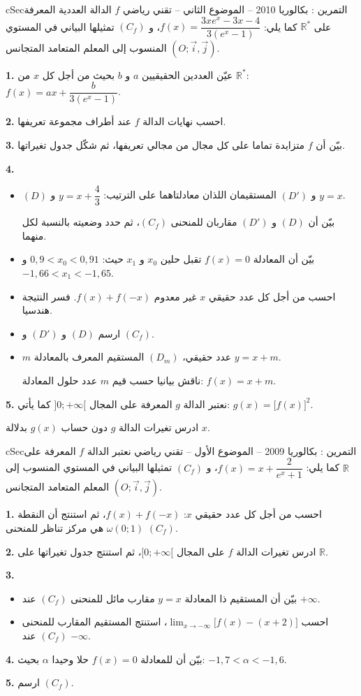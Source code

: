 \documentclass[12pt,a4paper]{article}
\newenvironment{BOX}[2]{\begin{otherlanguage}{english}\begin{arbox}{#1}{#2}}{\end{arbox}\end{otherlanguage}}
\newcounter{exo}
\newenvironment{tamrin}[1]{\stepcounter{exo}\begin{BOX}{cSec}{التمرين \theexo: #1}}{\end{BOX}}
\newcommand{\R}{\mathbb{R}}
\newenvironment{sq}{\begin{itemize}[leftmargin=2.4em,itemsep=3pt]}{\end{itemize}}
\newcommand{\qa}{\item[(أ)]}\newcommand{\qb}{\item[(ب)]}\newcommand{\qc}{\item[(جـ)]}\newcommand{\qd}{\item[(د)]}\newcommand{\qe}{\item[(هـ)]}
\newcommand{\QQ}[1]{\par\smallskip\textbf{#1.} }
\begin{document}
\begin{tamrin}{بكالوريا 2010 -- الموضوع الثاني -- تقني رياضي}
$f$ الدالة العددية المعرفة على $\R^*$ كما يلي: $f(x)=\dfrac{3xe^{x}-3x-4}{3\left(e^{x}-1\right)}$،
و $(C_f)$ تمثيلها البياني في المستوي المنسوب إلى المعلم المتعامد المتجانس $(O;\vec i,\vec j)$.
\QQ{1} عيّن العددين الحقيقيين $a$ و $b$ بحيث من أجل كل $x$ من $\R^*$: $f(x)=ax+\dfrac{b}{3\left(e^{x}-1\right)}$.
\QQ{2} احسب نهايات الدالة $f$ عند أطراف مجموعة تعريفها.
\QQ{3} بيّن أن $f$ متزايدة تماما على كل مجال من مجالي تعريفها، ثم شكّل جدول تغيراتها.
\QQ{4}
\begin{sq}
\qa $(D)$ و $(D')$ المستقيمان اللذان معادلتاهما على الترتيب: $y=x+\dfrac43$ و $y=x$.
\par بيّن أن $(D)$ و $(D')$ مقاربان للمنحنى $(C_f)$، ثم حدد وضعيته بالنسبة لكل منهما.
\qb بيّن أن المعادلة $f(x)=0$ تقبل حلين $x_0$ و $x_1$ حيث: $0{,}9<x_0<0{,}91$ و $-1{,}66<x_1<-1{,}65$.
\qc احسب من أجل كل عدد حقيقي $x$ غير معدوم $f(x)+f(-x)$. فسر النتيجة هندسيا.
\qd ارسم $(D)$ و $(D')$ و $(C_f)$.
\qe $m$ عدد حقيقي، $(D_m)$ المستقيم المعرف بالمعادلة $y=x+m$.
\par ناقش بيانيا حسب قيم $m$ عدد حلول المعادلة: $f(x)=x+m$.
\end{sq}
\QQ{5} نعتبر الدالة $g$ المعرفة على المجال $]0;+\infty[$ كما يأتي: $g(x)=\big[f(x)\big]^2$.
\par ادرس تغيرات الدالة $g$ دون حساب $g(x)$ بدلالة $x$.
\end{tamrin}

\begin{tamrin}{بكالوريا 2009 -- الموضوع الأول -- تقني رياضي}
نعتبر الدالة $f$ المعرفة على $\R$ كما يلي: $f(x)=x+\dfrac{2}{e^{x}+1}$،
و $(C_f)$ تمثيلها البياني في المستوي المنسوب إلى المعلم المتعامد المتجانس $(O;\vec i,\vec j)$.
\QQ{1} احسب من أجل كل عدد حقيقي $x$: $f(x)+f(-x)$، ثم استنتج أن النقطة $\omega(0;1)$ هي مركز تناظر للمنحنى $(C_f)$.
\QQ{2} ادرس تغيرات الدالة $f$ على المجال $[0;+\infty[$، ثم استنتج جدول تغيراتها على $\R$.
\QQ{3}
\begin{sq}
\qa بيّن أن المستقيم ذا المعادلة $y=x$ مقارب مائل للمنحنى $(C_f)$ عند $+\infty$.
\qb احسب $\displaystyle\lim_{x\to-\infty}\big[f(x)-(x+2)\big]$، استنتج المستقيم المقارب للمنحنى $(C_f)$ عند $-\infty$.
\end{sq}
\QQ{4} بيّن أن للمعادلة $f(x)=0$ حلا وحيدا $\alpha$ بحيث: $-1{,}7<\alpha<-1{,}6$.
\QQ{5} ارسم $(C_f)$.
\end{tamrin}
\end{document}

